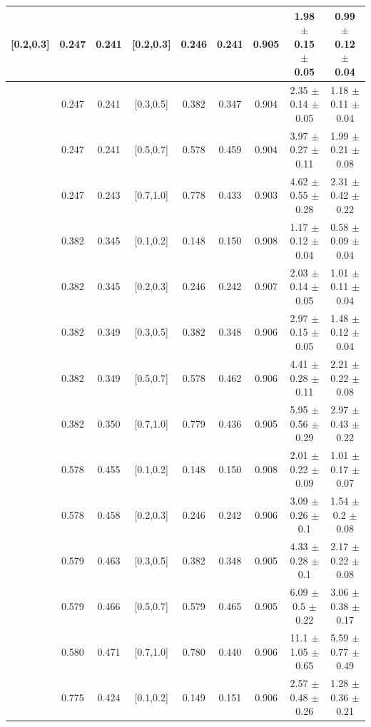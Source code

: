 \documentclass[aps,prX,preprint,groupedaddress,linenumbers]{revtex4-1}
\begin{document}
\begin{table}[H]
\begin{tabular}{|c|c|c|c|c|c|c|c|c|}
[0.2,0.3]	&	0.247	&	0.241	&	[0.2,0.3]	&	0.246	&	0.241	&	0.905	&1.98  $\pm$ 0.15  $\pm$ 0.05   &	0.99  $\pm$ 0.12  $\pm$ 0.04  \\ \hline
[0.2,0.3]	&	0.247	&	0.241	&	[0.3,0.5]	&	0.382	&	0.347	&	0.904	&2.35  $\pm$ 0.14  $\pm$ 0.05   &	1.18  $\pm$ 0.11  $\pm$ 0.04  \\ \hline
[0.2,0.3]	&	0.247	&	0.241	&	[0.5,0.7]	&	0.578	&	0.459	&	0.904	&3.97  $\pm$ 0.27  $\pm$ 0.11   &	1.99  $\pm$ 0.21  $\pm$ 0.08  \\ \hline
[0.2,0.3]	&	0.247	&	0.243	&	[0.7,1.0]	&	0.778	&	0.433	&	0.903	&4.62  $\pm$ 0.55  $\pm$ 0.28   &	2.31  $\pm$ 0.42  $\pm$ 0.22  \\ \hline
\hline
[0.3,0.5]	&	0.382	&	0.345	&	[0.1,0.2]	&	0.148	&	0.150	&	0.908	&1.17  $\pm$ 0.12  $\pm$ 0.04   &	0.58  $\pm$ 0.09  $\pm$ 0.04  \\ \hline
[0.3,0.5]	&	0.382	&	0.345	&	[0.2,0.3]	&	0.246	&	0.242	&	0.907	&2.03  $\pm$ 0.14  $\pm$ 0.05   &	1.01  $\pm$ 0.11  $\pm$ 0.04  \\ \hline
[0.3,0.5]	&	0.382	&	0.349	&	[0.3,0.5]	&	0.382	&	0.348	&	0.906	&2.97  $\pm$ 0.15  $\pm$ 0.05   &	1.48  $\pm$ 0.12  $\pm$ 0.04  \\ \hline
[0.3,0.5]	&	0.382	&	0.349	&	[0.5,0.7]	&	0.578	&	0.462	&	0.906	&4.41  $\pm$ 0.28  $\pm$ 0.11   &	2.21  $\pm$ 0.22  $\pm$ 0.08  \\ \hline
[0.3,0.5]	&	0.382	&	0.350	&	[0.7,1.0]	&	0.779	&	0.436	&	0.905	&5.95  $\pm$ 0.56  $\pm$ 0.29   &	2.97  $\pm$ 0.43  $\pm$ 0.22  \\ \hline
\hline
[0.5,0.7]	&	0.578	&	0.455	&	[0.1,0.2]	&	0.148	&	0.150	&	0.908	&2.01  $\pm$ 0.22  $\pm$ 0.09   &	1.01  $\pm$ 0.17  $\pm$ 0.07  \\ \hline
[0.5,0.7]	&	0.578	&	0.458	&	[0.2,0.3]	&	0.246	&	0.242	&	0.906	&3.09  $\pm$ 0.26  $\pm$ 0.1    &	1.54  $\pm$ 0.2  $\pm$ 0.08   \\ \hline
[0.5,0.7]	&	0.579	&	0.463	&	[0.3,0.5]	&	0.382	&	0.348	&	0.905	&4.33  $\pm$ 0.28  $\pm$ 0.1    &	2.17  $\pm$ 0.22  $\pm$ 0.08  \\ \hline
[0.5,0.7]	&	0.579	&	0.466	&	[0.5,0.7]	&	0.579	&	0.465	&	0.905	&6.09  $\pm$ 0.5  $\pm$ 0.22    &	3.06  $\pm$ 0.38  $\pm$ 0.17  \\ \hline
[0.5,0.7]	&	0.580	&	0.471	&	[0.7,1.0]	&	0.780	&	0.440	&	0.906	&11.1  $\pm$ 1.05  $\pm$ 0.65   &	5.59  $\pm$ 0.77  $\pm$ 0.49  \\ \hline
\hline
[0.7,1.0]	&	0.775	&	0.424	&	[0.1,0.2]	&	0.149	&	0.151	&	0.906	&2.57  $\pm$ 0.48  $\pm$ 0.26   &	1.28  $\pm$ 0.36  $\pm$ 0.21  \\ \hline

\end{tabular}
\end{table}
\end{document}
